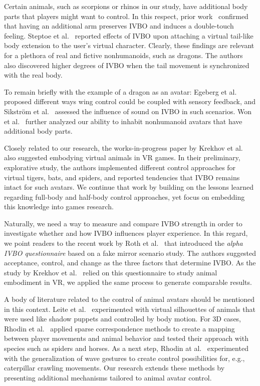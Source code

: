 \documentclass{sigchi}
\begin{document}
Certain animals, such as scorpions or rhinos in our study, have additional body parts that players might want to control. In this respect, prior work~\cite{ehrsson2009many,guterstam2011illusion} confirmed that having an additional arm preserves IVBO and induces a double-touch feeling. Steptoe et al.~ reported effects of IVBO upon attaching a virtual tail-like body extension to the user’s virtual character. Clearly, these findings are relevant for a plethora of real and fictive nonhumanoids, such as dragons. The authors also discovered higher degrees of IVBO when the tail movement is synchronized with the real body. 




To remain briefly with the example of a dragon as an avatar: Egeberg et al.~ proposed different ways wing control could be coupled with sensory feedback, and Sikstr\"om et al.~ assessed the influence of sound on IVBO in such scenarios.  Won et al.~ further analyzed our ability to inhabit nonhumanoid avatars that have additional body parts.

Closely related to our research, the works-in-progress paper by Krekhov et al.~ also suggested embodying virtual animals in VR games. In their preliminary, explorative study, the authors implemented different control approaches for virtual tigers, bats, and spiders, and reported tendencies that IVBO remains intact for such avatars. We continue that work by building on the lessons learned regarding full-body and half-body control approaches, yet focus on embedding this knowledge into games research.

Naturally, we need a way to measure and compare IVBO strength in order to investigate whether and how IVBO influences player experience. In this regard, we point readers to the recent work by Roth et al.~ that introduced the \textit{alpha IVBO questionnaire} based on a fake mirror scenario study. The authors suggested acceptance, control, and change as the three factors that determine IVBO. As the study by Krekhov et al.~ relied on this questionnaire to study animal embodiment in VR, we  applied the same process to generate comparable results.

A body of literature related to the control of animal avatars should be mentioned in this context. Leite et al.~ experimented with virtual silhouettes of animals that were used like shadow puppets and controlled by body motion. For 3D cases, Rhodin et al.~ applied sparse correspondence methods to create a mapping between player movements and animal behavior and tested their approach with species such as spiders and horses. As a next step, Rhodin at al.~ experimented with the generalization of wave gestures to create control possibilities for, e.g., caterpillar crawling movements. Our research extends these methods by presenting additional mechanisms tailored to animal avatar control.
\end{document}

